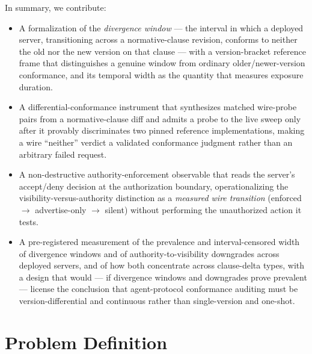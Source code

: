 \documentclass[11pt]{article}
\begin{document}
In summary, we contribute:
\begin{itemize}[leftmargin=1.4em]
\item A formalization of the \emph{divergence window} --- the interval in which a deployed server, transitioning across a normative-clause revision, conforms to neither the old nor the new version on that clause --- with a version-bracket reference frame that distinguishes a genuine window from ordinary older/newer-version conformance, and its temporal width as the quantity that measures exposure duration.
\item A differential-conformance instrument that synthesizes matched wire-probe pairs from a normative-clause diff and admits a probe to the live sweep only after it provably discriminates two pinned reference implementations, making a wire ``neither'' verdict a validated conformance judgment rather than an arbitrary failed request.
\item A non-destructive authority-enforcement observable that reads the server's accept/deny decision at the authorization boundary, operationalizing the visibility-versus-authority distinction as a \emph{measured wire transition} (enforced $\to$ advertise-only $\to$ silent) without performing the unauthorized action it tests.
\item A pre-registered measurement of the prevalence and interval-censored width of divergence windows and of authority-to-visibility downgrades across deployed servers, and of how both concentrate across clause-delta types, with a design that would --- if divergence windows and downgrades prove prevalent --- license the conclusion that agent-protocol conformance auditing must be version-differential and continuous rather than single-version and one-shot.
\end{itemize}

\section{Problem Definition}
\end{document}
